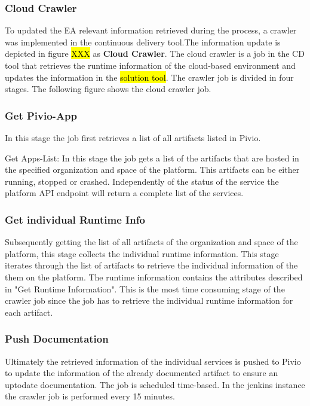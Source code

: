 \subsubsection{Cloud Crawler}
To updated the EA relevant information retrieved during the process, a crawler was implemented in the continuous delivery tool.The information update is depicted in figure \hl{XXX} as \textbf{Cloud Crawler}. The cloud crawler is a job in the CD tool that retrieves the runtime information of the cloud-based environment and updates the information in the \hl{solution tool}. The crawler job is divided in four stages. The following figure shows the cloud crawler job.


\subsubsection{Get Pivio-App}

In this stage the job first retrieves a list of all artifacts listed in Pivio. 

Get Apps-List: 
In this stage the job gets a list of the artifacts that are hosted in the specified organization and space of the platform. This artifacts can be either running, stopped or crashed. Independently of the status of the service the platform API endpoint will return a complete list of the services.


\subsubsection{Get individual Runtime Info}
Subsequently getting the list of all artifacts of the organization and space of the platform, this stage collects the individual runtime information. This stage iterates through the list of artifacts to retrieve the individual information of the them on the platform. The runtime information contains the attributes described in "Get Runtime Information". This is the most time consuming stage of the crawler job since the job has to retrieve the individual runtime information for each artifact.

\subsubsection{Push Documentation}
Ultimately the retrieved information of the individual services is pushed to Pivio to update the information of the already documented artifact to ensure an uptodate documentation.
The job is scheduled time-based. In the jenkins instance the crawler job is performed every 15 minutes.
